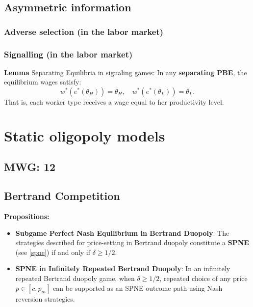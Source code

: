 \documentclass{article}
\begin{document}
\subsection{Asymmetric information}

\subsubsection{Adverse selection (in the labor market)}

\subsubsection{Signalling (in the labor market)}

\textbf{Lemma} Separating Equilibria in signaling games: In any \textbf{separating PBE}, the equilibrium wages satisfy:
\[
w^*(e^*(\theta_H)) = \theta_H, \quad w^*(e^*(\theta_L)) = \theta_L.
\]
That is, each worker type receives a wage equal to her productivity level.




\section{Static oligopoly models}\label{SO}
\subsection*{MWG: 12}

\subsection{Bertrand Competition}

\textbf{Propositions:}
\begin{itemize}
    \item \textbf{Subgame Perfect Nash Equilibrium in Bertrand Duopoly}: The strategies described for price-setting in Bertrand duopoly constitute a \textbf{SPNE} (see \ref{spne}) if and only if $\delta \geq 1/2$.
    
    \item \textbf{SPNE in Infinitely Repeated Bertrand Duopoly}: In an infinitely repeated Bertrand duopoly game, when $\delta \geq 1/2$, repeated choice of any price $p \in [c, p_m]$ can be supported as an SPNE outcome path using Nash reversion strategies.

\end{itemize}
\end{document}
